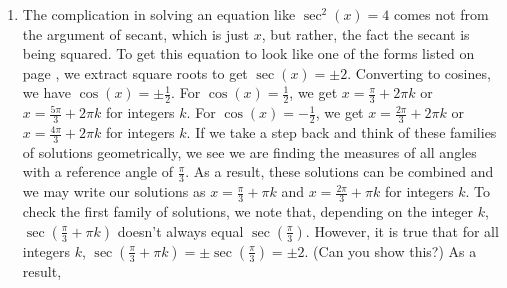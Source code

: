 {\begin{enumerate}
\[\begin{array}{rclr}
\cot\left(3\left[ \frac{\pi}{6} + \frac{\pi}{3} k\right]\right)  &  = &  \cot\left(\frac{\pi}{2} + \pi k\right)  & \\ [3pt]
																												& =  &   \cot\left(\frac{\pi}{2}\right) &  \text{(the period of cotangent is $\pi$)} \\ [3pt]
																												& =  & 0 & \\
																								
\end{array}\] 



 As $k$ runs through the integers, we obtain six answers, corresponding to $k=0$ through $k=5$, which lie in $[0, 2\pi)$: $x = \frac{\pi}{6}$, $\frac{\pi}{2}$, $\frac{5\pi}{6}$, $\frac{7\pi}{6}$ , $\frac{3\pi}{2}$ and  $\frac{11\pi}{6}$: see Figure \ref{fig:trigeg1-3}. 
 


\item The complication in solving an equation like $\sec^{2}(x) = 4$ comes not from the argument of secant, which is just $x$, but rather, the fact the secant is being squared.  To get this equation to look like one of the forms listed on page \pageref{trigeqnstrategy1}, we extract square roots to get $\sec(x) = \pm 2$. Converting to cosines, we have  $\cos(x) = \pm \frac{1}{2}$.  For $\cos(x) = \frac{1}{2}$, we get $x = \frac{\pi}{3} + 2\pi k$ or $x = \frac{5\pi}{3} + 2\pi k$ for integers $k$.  For $\cos(x) = -\frac{1}{2}$, we get $x = \frac{2\pi}{3} + 2\pi k$ or $x = \frac{4\pi}{3} + 2\pi k$ for integers $k$.  If we take a step back and think of these families of solutions geometrically, we see we are finding the measures of all angles with a reference angle of $\frac{\pi}{3}$.  As a result, these solutions can be combined and we may write our solutions as $x = \frac{\pi}{3} + \pi k$ and $x = \frac{2\pi}{3} + \pi k$ for integers $k$.  To check the first family of solutions, we note that, depending on the integer $k$,  $\sec\left(\frac{\pi}{3} + \pi k\right)$ doesn't always equal $\sec\left(\frac{\pi}{3}\right)$.  However, it is true that for all integers $k$,  $\sec\left(\frac{\pi}{3} + \pi k\right) = \pm \sec\left(\frac{\pi}{3}\right) = \pm 2$.  (Can you show this?)  As a result, 



\end{enumerate}}
